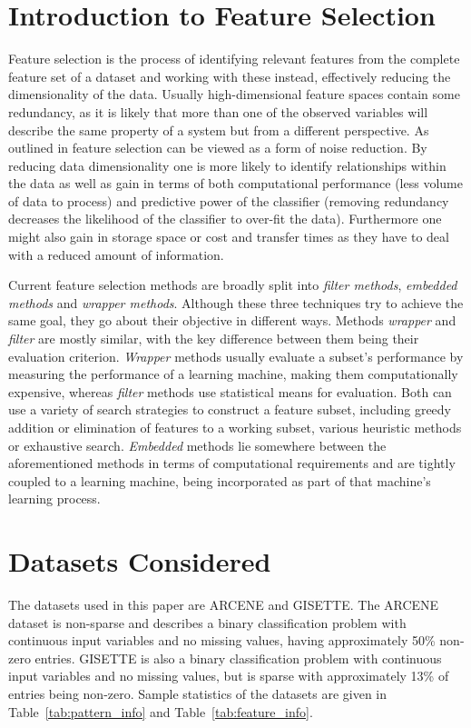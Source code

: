 \documentclass[12pt,a4paper,twocolumn]{article}
\begin{document}
\section{Introduction to Feature Selection}
Feature selection is the process of identifying relevant features from the complete feature set of a dataset and working with these instead, effectively reducing the dimensionality of the data. Usually high-dimensional feature spaces contain some redundancy, as it is likely that more than one of the observed variables will describe the same property of a system but from a different perspective. As outlined in \citep{feature_selection_intro} feature selection can be viewed as a form of noise reduction. By reducing data dimensionality one is more likely to identify relationships within the data as well as gain in terms of both computational performance (less volume of data to process) and predictive power of the classifier (removing redundancy decreases the likelihood of the classifier to over-fit the data). Furthermore one might also gain in storage space or cost and transfer times as they have to deal with a reduced amount of information.

Current feature selection methods are broadly split into \emph{filter methods}, \emph{embedded methods} and \emph{wrapper methods}\citep{feature_selection_intro}\citep{filter_methods}. Although these three techniques try to achieve the same goal, they  go about their objective in different ways. Methods \emph{wrapper} and \emph{filter} are mostly similar, with the key difference between them being their evaluation criterion. \emph{Wrapper} methods usually evaluate a subset's performance by measuring the performance of a learning machine, making them computationally expensive, whereas \emph{filter} methods use statistical means for evaluation. Both can use a variety of search strategies to construct a feature subset, including greedy addition or elimination of features to a working subset, various heuristic methods or exhaustive search. \emph{Embedded} methods lie somewhere between the aforementioned  methods in terms of computational requirements and are tightly coupled to a learning machine, being incorporated as part of that machine's learning process.

\section{Datasets Considered}
The datasets used in this paper are ARCENE and GISETTE. The ARCENE dataset is non-sparse and describes a binary classification problem with continuous input variables and no missing values, having approximately 50\% non-zero entries. GISETTE is also a binary classification problem with continuous input variables and no missing values, but is sparse with approximately 13\% of entries being non-zero. Sample statistics of the datasets are given in Table~\ref{tab:pattern_info} and Table~\ref{tab:feature_info}.
\end{document}
